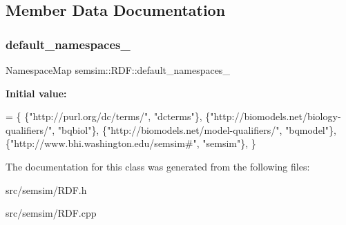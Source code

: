 \subsection{Member Data Documentation}
\mbox{\label{classsemsim_1_1RDF_a9a2f19c41f10c772cb4dece71c473bd2}} 
\subsubsection{\texorpdfstring{default\+\_\+namespaces\+\_\+}{default\_namespaces\_}}
{\footnotesize\ttfamily Namespace\+Map semsim\+::\+R\+D\+F\+::default\+\_\+namespaces\+\_\+}

{\bfseries Initial value\+:}
\begin{DoxyCode}
= \{
                \{\textcolor{stringliteral}{"http://purl.org/dc/terms/"},                \textcolor{stringliteral}{"dcterms"}\},
                \{\textcolor{stringliteral}{"http://biomodels.net/biology-qualifiers/"}, \textcolor{stringliteral}{"bqbiol"}\},
                \{\textcolor{stringliteral}{"http://biomodels.net/model-qualifiers/"},   \textcolor{stringliteral}{"bqmodel"}\},
                \{\textcolor{stringliteral}{"http://www.bhi.washington.edu/semsim#"},    \textcolor{stringliteral}{"semsim"}\},
        \}
\end{DoxyCode}


The documentation for this class was generated from the following files\+:\begin{DoxyCompactItemize}
\item 
src/semsim/R\+D\+F.\+h\item 
src/semsim/R\+D\+F.\+cpp\end{DoxyCompactItemize}
